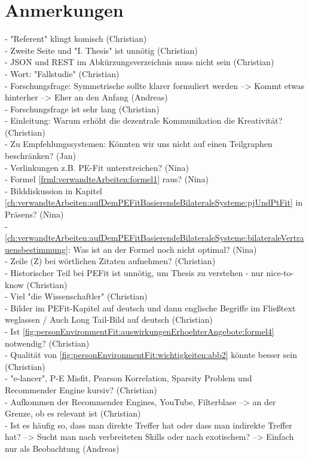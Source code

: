 \section{Anmerkungen}
\label{ch:fazit:anmerkungen}
- "Referent" klingt komisch (Christian)\\
- Zweite Seite und "I. Thesis" ist unnötig (Christian)\\
- JSON und REST im Abkürzungsverzeichnis muss nicht sein (Christian)\\
- Wort: "Fallstudie" (Christian)\\
- Forschungsfrage: Symmetrische sollte klarer formuliert werden --> Kommt etwas hinterher --> Eher an den Anfang (Andreas)\\
- Forschungsfrage ist sehr lang (Christian)\\
- Einleitung: Warum erhöht die dezentrale Kommunikation die Kreativität? (Christian)\\
- Zu Empfehlungssystemen: Könnten wir uns nicht auf einen Teilgraphen beschränken? (Jan)\\
- Verlinkungen z.B. PE-Fit unterstreichen? (Nina)\\
- Formel \ref{frml:verwandteArbeiten:formel1} raus? (Nina)\\
- Bilddiskussion in Kapitel \ref{ch:verwandteArbeiten:aufDemPEFitBasierendeBilateraleSysteme:pjUndPtFit} in Präsens? (Nina)\\
- \ref{ch:verwandteArbeiten:aufDemPEFitBasierendeBilateraleSysteme:bilateraleVertrauensbestimmung}: Was ist an der Formel noch nicht optimal? (Nina)\\
- Zeile (Z) bei wörtlichen Zitaten aufnehmen? (Christian)\\
- Historischer Teil bei \ac{PEFit} ist unnötig, um Thesis zu verstehen - nur nice-to-know (Christian)\\
- Viel "die Wissenschaftler" (Christian)\\
- Bilder im \ac{PEFit}-Kapitel auf deutsch und dann englische Begriffe im Fließtext weglassen / Auch Long Tail-Bild auf deutsch (Christian)\\
- Ist \ref{fig:personEnvironmentFit:auswirkungenErhoehterAngebote:formel4} notwendig? (Christian)\\
- Qualität von \ref{fig:personEnvironmentFit:wichtigkeiten:abb2} könnte besser sein (Christian)\\
- "e-lancer", P-E Misfit, Pearson Korrelation, Sparsity Problem und Recommender Engine kursiv? (Christian)\\
- Aufkommen der Recommender Engines, YouTube, Filterblase --> an der Grenze, ob es relevant ist (Christian)\\
- Ist es häufig so, dass man direkte Treffer hat oder dass man indirekte Treffer hat? --> Sucht man nach verbreiteten Skills oder nach exotischem? --> Einfach nur als Beobachtung (Andreas)
